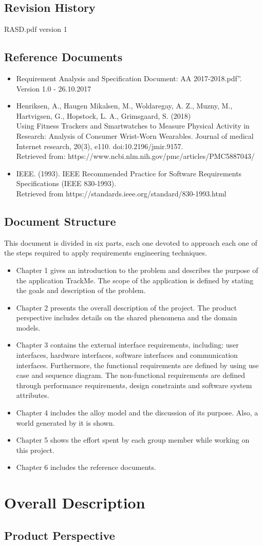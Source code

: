 \documentclass[12pt]{article}
\begin{document}
\subsection{Revision History}
RASD.pdf version 1
\subsection{Reference Documents}
\begin{itemize}
\item Requirement Analysis and Specification Document: AA 2017-2018.pdf”. Version 1.0 - 26.10.2017
\item Henriksen, A., Haugen Mikalsen, M., Woldaregay, A. Z., Muzny, M., Hartvigsen, G., Hopstock, L. A., Grimsgaard, S. (2018)
\\Using Fitness Trackers and Smartwatches to Measure Physical Activity in Research: Analysis of Consumer Wrist-Worn Wearables. Journal of medical Internet research, 20(3), e110. doi:10.2196/jmir.9157. 
\\Retrieved from: https://www.ncbi.nlm.nih.gov/pmc/articles/PMC5887043/
\item IEEE. (1993). IEEE Recommended Practice for Software Requirements Specifications (IEEE 830-1993). 
\\Retrieved from https://standards.ieee.org/standard/830-1993.html


\end{itemize}
\subsection{Document Structure}
This document is divided in six parts, each one devoted to approach each one of the steps required to apply requirements engineering techniques.\\
\begin{itemize}
\item Chapter 1 gives an introduction to the problem and describes the purpose of the application TrackMe. The scope of the application is defined by stating the goals and description of the problem.
\item Chapter 2 presents the overall description of the project. The product perspective includes details on the shared phenomena and the domain models.
\item Chapter 3 contains the external interface requirements, including: user interfaces, hardware interfaces, software interfaces and communication interfaces. Furthermore, the functional requirements are defined by using use case and sequence diagram. The non-functional requirements are defined through performance requirements, design constraints and software system attributes.
\item Chapter 4 includes the alloy model and the discussion of its purpose. Also, a world generated by it is shown.
\item Chapter 5 shows the effort spent by each group member while working on this project.
\item Chapter 6 includes the reference documents.

\end{itemize}

\section{Overall Description}
\subsection{Product Perspective}
\end{document}
